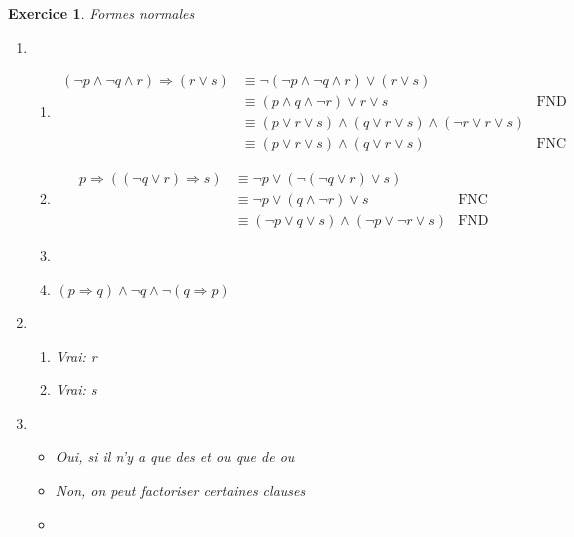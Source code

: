 \documentclass{article}
\theoremstyle{plain}
\newtheorem{exo}{Exercice}%
\begin{document}
\begin{exo}Formes normales
\begin{enumerate}
    \item 
    \begin{enumerate}
        \item \begin{align*}
            (\neg p \wedge \neg q \wedge r) \Rightarrow (r \vee s)  
                    &\equiv \neg(\neg p \wedge \neg q \wedge r) \vee (r \vee s)\\
                    &\equiv (p \wedge q \wedge \neg r) \vee r \vee s          &\text{FND} \\
                    &\equiv (p \vee r \vee s) \wedge (q \vee r \vee s) \wedge (\neg r \vee r \vee s) \\
                    &\equiv (p \vee r \vee s) \wedge (q \vee r \vee s)          &\text{FNC}
        \end{align*}
        
        \item \begin{align*}
             p \Rightarrow ((\neg q \vee r) \Rightarrow s)
                &\equiv \neg p \vee (\neg(\neg q \vee r) \vee s) \\
                &\equiv \neg p \vee (q \wedge \neg r) \vee s     &\text{FNC} \\
                &\equiv (\neg p \vee q \vee s) \wedge (\neg p \vee \neg r \vee s)  &\text{FND}
        \end{align*}

        \item 
        \item $(p \Rightarrow q) \wedge \neg q \wedge \neg(q \Rightarrow p)$
    \end{enumerate}

    \item \begin{enumerate}
        \item Vrai: r
        \item Vrai: s
    \end{enumerate}

    \item \begin{itemize}
        \item Oui, si il n'y a que des et ou que de ou
        \item Non, on peut factoriser certaines clauses
        \item 
    \end{itemize}
\end{enumerate}
\end{exo}
\end{document}
